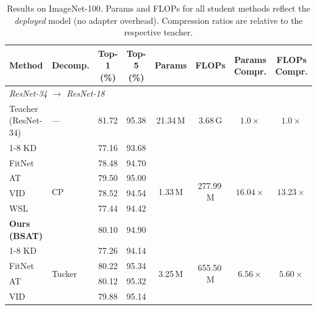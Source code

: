 \documentclass[conference]{IEEEtran}
\begin{document}
\begin{table}[t]
  \centering
  \caption{Results on ImageNet-100. Params and FLOPs for all student methods
    reflect the \emph{deployed} model (no adapter overhead).
    Compression ratios are relative to the respective teacher.}
  \label{tab:imagenet100}
  \setlength{\tabcolsep}{4.5pt}
  \begin{tabular}{llcccccc}
    \toprule
    \textbf{Method} & \textbf{Decomp.} &
    \textbf{Top-1 (\%)} & \textbf{Top-5 (\%)} &
    \textbf{Params} & \textbf{FLOPs} &
    \textbf{Params Compr.} & \textbf{FLOPs Compr.} \\
    \midrule
    \multicolumn{8}{l}{\textit{ResNet-34 $\to$ ResNet-18}} \\
    \midrule
    Teacher (ResNet-34) & —
      & 81.72 & 95.38 & 21.34\,M & 3.68\,G & $1.0\times$ & $1.0\times$ \\
    \cline{1-8}
    KD \cite{hinton2015distilling}                       & \multirow{6}{*}{CP}     & 77.16 & 93.68 & \multirow{6}{*}{1.33\,M} & \multirow{6}{*}{277.99\,M} & \multirow{6}{*}{$16.04\times$} & \multirow{6}{*}{$13.23\times$} \\
    FitNet \cite{romero2015fitnetshintsdeepnets}         &                         & 78.48 & 94.70 & & & & \\
    AT \cite{zagoruyko2016paying}                        &                         & 79.50 & 95.00 & & & & \\
    VID \cite{ahn2019variational}                        &                         & 78.52 & 94.54 & & & & \\
    WSL \cite{zhou2021rethinking}                        &                         & 77.44 & 94.42 & & & & \\
    \textbf{Ours (BSAT)}                                 &                         & 80.10 & 94.90 & & & & \\
    \cline{1-8}
    KD \cite{hinton2015distilling}                       & \multirow{6}{*}{Tucker} & 77.26 & 94.14 & \multirow{6}{*}{3.25\,M} & \multirow{6}{*}{655.50\,M} & \multirow{6}{*}{$6.56\times$} & \multirow{6}{*}{$5.60\times$} \\
    FitNet \cite{romero2015fitnetshintsdeepnets}         &                         & 80.22 & 95.34 & & & & \\
    AT \cite{zagoruyko2016paying}                        &                         & 80.12 & 95.32 & & & & \\
    VID \cite{ahn2019variational}                        &                         & 79.88 & 95.14 & & & & \\

\end{tabular}
\end{table}
\end{document}
